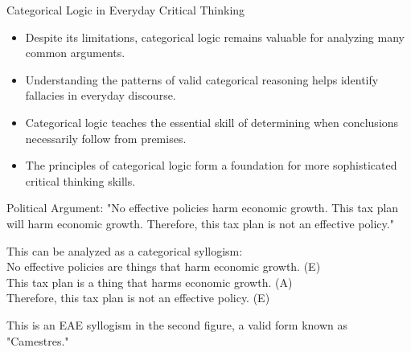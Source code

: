 \documentclass{beamer}
\begin{document}
	\begin{frame}{Categorical Logic in Everyday Critical Thinking}

		\begin{itemize}
			\item Despite its limitations, categorical logic remains valuable for analyzing many common arguments.
			\item Understanding the patterns of valid categorical reasoning helps identify fallacies in everyday discourse.
			\item Categorical logic teaches the essential skill of determining when conclusions necessarily follow from premises.
			\item The principles of categorical logic form a foundation for more sophisticated critical thinking skills.
		\end{itemize}
		
		\begin{example}
			\scriptsize
			Political Argument: "No effective policies harm economic growth. This tax plan will harm economic growth. Therefore, this tax plan is not an effective policy."
			
			This can be analyzed as a categorical syllogism:\\
			No effective policies are things that harm economic growth. (E)\\
			This tax plan is a thing that harms economic growth. (A)\\
			Therefore, this tax plan is not an effective policy. (E)
			
			This is an EAE syllogism in the second figure, a valid form known as "Camestres."
		\end{example}
	\end{frame}
\end{document}
